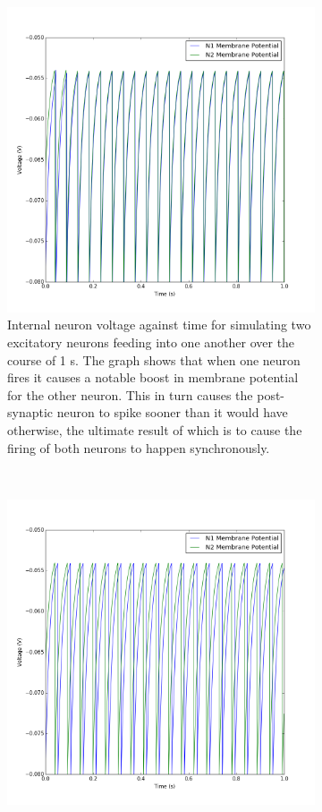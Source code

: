 \documentclass[12pt, a4paper]{article}
\begin{document}
\begin{figure}[H]
  \begin{subfigure}[t]{0.5\textwidth}
    \centering
    \includegraphics[width=0.95\linewidth]{figures/q5a}
    \caption{Internal neuron voltage against time for simulating two excitatory neurons feeding into one another over the course of 1 s. The graph shows that when one neuron fires it causes a notable boost in membrane potential for the other neuron. This in turn causes the post-synaptic neuron to spike sooner than it would have otherwise, the ultimate result of which is to cause the firing of both neurons to happen synchronously.}
  \end{subfigure}
  ~
  \begin{subfigure}[t]{0.5\textwidth}
    \centering
    \includegraphics[width=0.95\linewidth]{figures/q5b}

\end{subfigure}
\end{figure}
\end{document}

